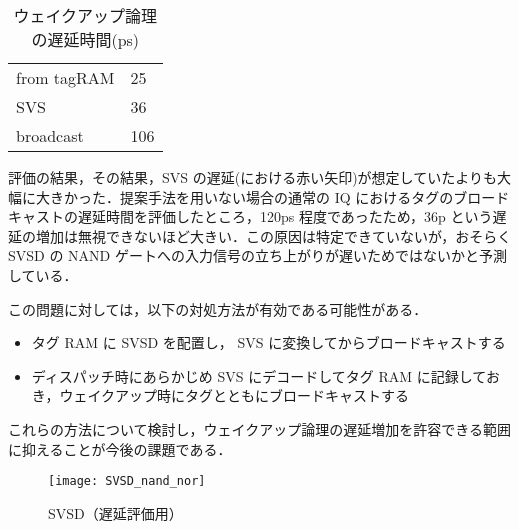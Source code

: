   \begin{table}[htb]
    \caption{ウェイクアップ論理の遅延時間(ps)}
    \footnotesize
    \center
      \begin{tabular}{l|l} \hline \hline
       from tagRAM & 25 \\
       SVS & 36 \\
       broadcast & 106 \\ \hline
    \end{tabular}
    \label{tab:delay}
  \end{table}

  評価の結果，その結果，SVS の遅延(における赤い矢印)が想定していたよりも大幅に大きかった．提案手法を用いない場合の通常の IQ におけるタグのブロードキャストの遅延時間を評価したところ，120ps 程度であったため，36p という遅延の増加は無視できないほど大きい．この原因は特定できていないが，おそらく SVSD の NAND ゲートへの入力信号の立ち上がりが遅いためではないかと予測している．

  この問題に対しては，以下の対処方法が有効である可能性がある．
  \begin{itemize}
  \item タグ RAM に SVSD を配置し， SVS に変換してからブロードキャストする
  \item ディスパッチ時にあらかじめ SVS にデコードしてタグ RAM に記録しておき，ウェイクアップ時にタグとともにブロードキャストする
  \end{itemize}
  これらの方法について検討し，ウェイクアップ論理の遅延増加を許容できる範囲に抑えることが今後の課題である．
  
\begin{figure}[htb]
  \centering
  \texttt{[image: SVSD\_nand\_nor]}
  \caption{SVSD（遅延評価用）}
  \label{fig:SVSD_nand_nor}
\end{figure}
